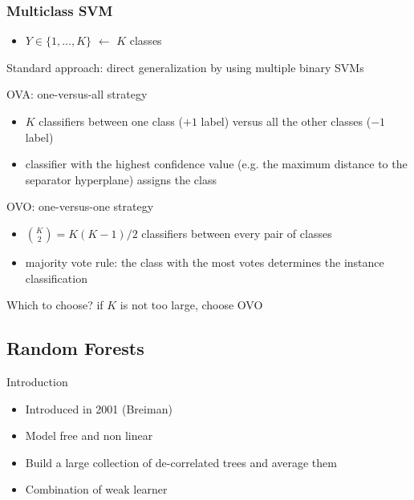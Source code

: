 \begin{frame}
  \frametitle{Multiclass SVM}
  \begin{itemize}
   \item $Y \in \{1,\ldots,K\}$ $\leftarrow$ $K$ classes
  \end{itemize}
   Standard approach: direct generalization by using multiple binary SVMs
   \begin{block}{OVA: one-versus-all strategy}
    \begin{itemize}
    \item $K$ classifiers between one class ($+1$ label) versus all the other classes ($-1$ label)
    \item[\doigt]  classifier with the highest confidence value (e.g. the maximum distance to the separator hyperplane) assigns the class
    \end{itemize}
   \end{block}
   
   
    \begin{block}{OVO: one-versus-one strategy}
    \begin{itemize}
    \item ${K \choose 2} =  K(K-1)/2$ classifiers between every pair of classes
    \item[\doigt] majority vote rule: the class with the most votes determines the instance classification
    \end{itemize}
   \end{block}
   
   Which to choose? if $K$ is not too large, choose OVO

  \end{frame}
  
  
  \subsection{Random Forests}
  \begin{frame}{Introduction}
    \begin{itemize}
    \item Introduced in 2001 (Breiman)
    \item Model free and non linear
    \item Build a large collection of de-correlated trees and average them
    \item Combination of weak learner
    \end{itemize}
  \end{frame}

